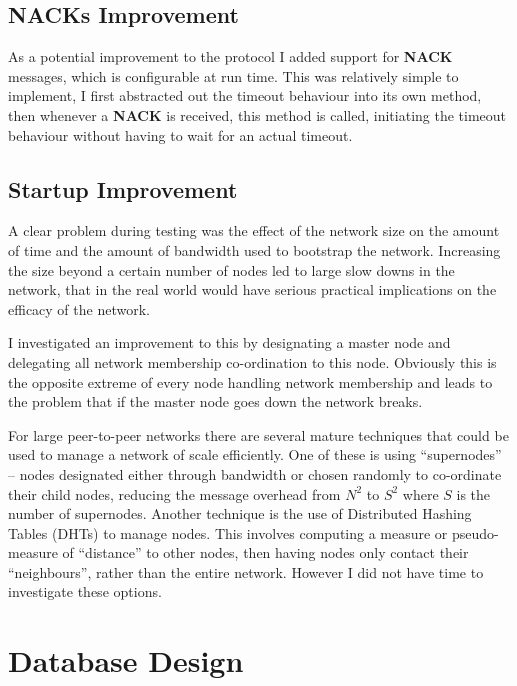 \documentclass[12pt,twoside,notitlepage]{report}
\newcommand{\msg}[1] {{\bf #1}}         %
\begin{document}

\subsection{NACKs Improvement}


As a potential improvement to the protocol I added support for \msg{NACK} messages, which is
configurable at run time. This was relatively simple to implement, I first abstracted out the
timeout behaviour into its own method, then whenever a \msg{NACK} is received, this method is
called, initiating the timeout behaviour without having to wait for an actual timeout.

\subsection{Startup Improvement}

A clear problem during testing was the effect of the network size on the amount of time and the
amount of bandwidth used to bootstrap the network. Increasing the size beyond a certain number of
nodes led to large slow downs in the network, that in the real world would have serious practical
implications on the efficacy of the network.

I investigated an improvement to this by designating a master node and delegating all network
membership co-ordination to this node. Obviously this is the opposite extreme of every node
handling network membership and leads to the problem that if the master node goes down the network
breaks.

For large peer-to-peer networks there are several mature techniques that could be used to manage a
network of scale efficiently. One of these is using ``supernodes'' -- nodes designated either
through bandwidth or chosen randomly to co-ordinate their child nodes, reducing the message
overhead from $N^2$ to $S^2$ where $S$ is the number of supernodes. Another technique is the use
of Distributed Hashing Tables (DHTs) to manage nodes. This involves computing a measure or
pseudo-measure of ``distance'' to other nodes, then having nodes only contact their
``neighbours'', rather than the entire network. However I did not have time to investigate these
options.

\section{Database Design}
\end{document}
